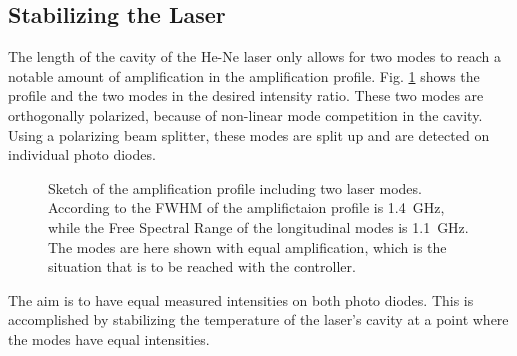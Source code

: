 \documentclass[a4paper,10pt]{article}
\begin{document}
\subsection{Stabilizing the Laser}
The length of the cavity of the He-Ne laser only allows for two modes to reach a notable amount of amplification in the amplification profile. Fig. \ref{fig_profile} shows the profile and the two modes in the desired intensity ratio. These two modes are orthogonally polarized, because of non-linear mode competition in the cavity.\cite{laserfaq} Using a polarizing beam splitter, these modes are split up and are detected on individual photo diodes.

\begin{figure}[htp!]
  \centering
  \caption{Sketch of the amplification profile including two laser modes. According to \cite{script} the FWHM of the amplifictaion profile is \SI{1.4}{\giga \hertz}, while the Free Spectral Range of the longitudinal modes is \SI{1.1}{\giga \hertz}. The modes are here shown with equal amplification, which is the situation that is to be reached with the controller.}
  \label{fig_profile}
\end{figure}
The aim is to have equal measured intensities on both photo diodes. This is accomplished by stabilizing the temperature of the laser's cavity at a point where the modes have equal intensities.
\end{document}
